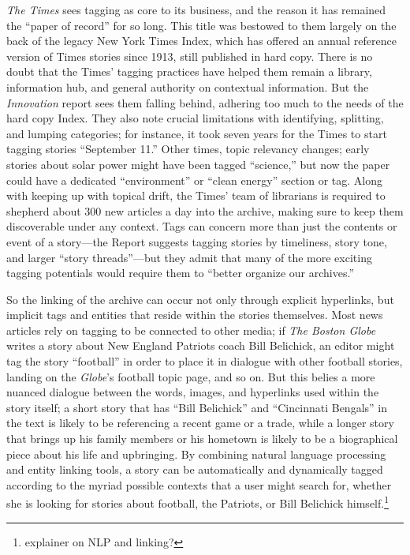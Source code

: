 \emph{The Times} sees tagging as core to its business, and the reason it has remained the ``paper of record'' for so long.\autocite[41]{_innovation_2014} This title was bestowed to them largely on the back of the legacy New York Times Index, which has offered an annual reference version of Times stories since 1913, still published in hard copy. There is no doubt that the Times' tagging practices have helped them remain a library, information hub, and general authority on contextual information. But the \emph{Innovation} report sees them falling behind, adhering too much to the needs of the hard copy Index. They also note crucial limitations with identifying, splitting, and lumping categories; for instance, it took seven years for the Times to start tagging stories ``September 11.'' Other times, topic relevancy changes; early stories about solar power might have been tagged ``science,'' but now the paper could have a dedicated ``environment'' or ``clean energy'' section or tag. Along with keeping up with topical drift, the Times' team of librarians is required to shepherd about 300 new articles a day into the archive, making sure to keep them discoverable under any context. Tags can concern more than just the contents or event of a story---the Report suggests tagging stories by timeliness, story tone, and larger ``story threads''---but they admit that many of the more exciting tagging potentials would require them to ``better organize our archives.''\autocite[41-42]{_innovation_2014}

So the linking of the archive can occur not only through explicit hyperlinks, but implicit tags and entities that reside within the stories themselves. Most news articles rely on tagging to be connected to other media; if \emph{The Boston Globe} writes a story about New England Patriots coach Bill Belichick, an editor might tag the story ``football'' in order to place it in dialogue with other football stories, landing on the \emph{Globe}'s football topic page, and so on. But this belies a more nuanced dialogue between the words, images, and hyperlinks used within the story itself; a short story that has ``Bill Belichick'' and ``Cincinnati Bengals'' in the text is likely to be referencing a recent game or a trade, while a longer story that brings up his family members or his hometown is likely to be a biographical piece about his life and upbringing. By combining natural language processing and entity linking tools, a story can be automatically and dynamically tagged according to the myriad possible contexts that a user might search for, whether she is looking for stories about football, the Patriots, or Bill Belichick himself.\footnote{explainer on NLP and linking?}

